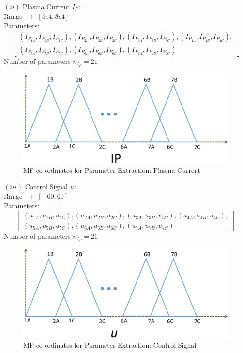 \par
\noindent$ \left( ii\right) $ Plasma Current $I_P$: \\
Range $\rightarrow$ $ \left[ 5e4, 8e4\right] $ \\
Parameters:
\[\left[ \begin{array}{l}
\left( {{I_{{P_{1A}}}},{I_{{P_{1B}}}},{I_{{P_{1C}}}}} \right),\left( {{I_{{P_{2A}}}},{I_{{P_{2B}}}},{I_{{P_{2C}}}}} \right),\left( {{I_{{P_{3A}}}},{I_{{P_{3B}}}},{I_{{P_{3C}}}}} \right),\left( {{I_{{P_{4A}}}},{I_{{P_{4B}}}},{I_{{P_{4C}}}}} \right),\\
\left( {{I_{{P_{5A}}}},{I_{{P_{5B}}}},{I_{{P_{5C}}}}} \right),\left( {{I_{{P_{6A}}}},{I_{{P_{6B}}}},{I_{{P_{6C}}}}} \right),\left( {{I_{{P_{7A}}}},{I_{{P_{7B}}}},{I_{{P_{7C}}}}} \right)
\end{array} \right]\]
Number of parameters $n_{I_P} = 21$
\begin{figure}[h!]
	\centering
	\includegraphics[width=0.95\linewidth]{Chapter5/chapter5/Fig8_FCP_Ip}
	\caption{MF co-ordinates for Parameter Extraction: Plasma Current}
	\label{fig:Fig5_8}
\end{figure}

\par
\noindent$ \left( iii\right) $ Control Signal $u$: \\
Range $\rightarrow$ $ \left[ -60, 60\right] $ \\
Parameters:
\[\left[ \begin{array}{l}
\left( {{u_{1A}},{u_{1B}},{u_{1C}}} \right),\left( {{u_{2A}},{u_{2B}},{u_{2C}}} \right),\left( {{u_{3A}},{u_{3B}},{u_{3C}}} \right),\left( {{u_{4A}},{u_{4B}},{u_{4C}}} \right),\\
\left( {{u_{5A}},{u_{5B}},{u_{5C}}} \right),\left( {{u_{6A}},{u_{6B}},{u_{6C}}} \right),\left( {{u_{7A}},{u_{7B}},{u_{7C}}} \right)
\end{array} \right]\]
Number of parameters $n_{I_P} = 21$
\begin{figure}[h!]
	\centering
	\includegraphics[width=0.95\linewidth]{Chapter5/chapter5/Fig9_FCP_u}
	\caption{MF co-ordinates for Parameter Extraction: Control Signal}
	\label{fig:Fig5_9}
\end{figure}

